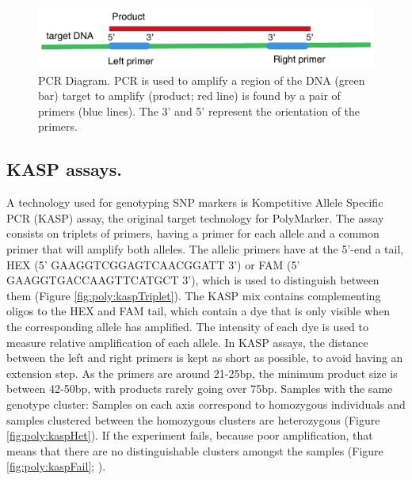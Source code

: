 \begin{figure}
\includegraphics[width=1\textwidth]{PolyMarker/Figures/intro/amplificationProduct.pdf}
\caption[PCR Diagram]{PCR Diagram. PCR is used to amplify a region of the DNA (green bar) target to amplify (product; red line) is found by a pair of primers (blue lines). The 3' and 5' represent the orientation of the primers.}
\label{fig:poly:amplificationProduct}
\end{figure}

\subsection{KASP assays.}
A technology used for genotyping SNP markers is Kompetitive Allele Specific PCR (KASP) assay, the original target technology for PolyMarker.
The assay consists on triplets of primers, having a primer for each allele and a common primer that will amplify both alleles. 
The allelic primers have at the 5'-end a tail, HEX (5' GAAGGTCGGAGTCAACGGATT 3') or FAM (5' GAAGGTGACCAAGTTCATGCT 3'), which is used to distinguish between them (Figure \ref{fig:poly:kaspTriplet}). 
The KASP mix contains complementing oligos to the HEX and FAM tail, which contain a dye that is only visible when the corresponding allele has amplified. 
The intensity of each dye is used to measure relative amplification of each allele. 
In KASP assays, the distance between the left and right primers is kept as short as possible, to avoid having an extension step. 
As the primers are around 21-25bp, the minimum product size is between 42-50bp, with products rarely going over 75bp.  
Samples with the same genotype cluster: Samples on each axis correspond to homozygous individuals and samples clustered between the homozygous clusters are heterozygous (Figure \ref{fig:poly:kaspHet}). 
If the experiment fails, because poor amplification, that means that there are no distinguishable clusters amongst the samples (Figure \ref{fig:poly:kaspFail}; \citealt{LGC}).


